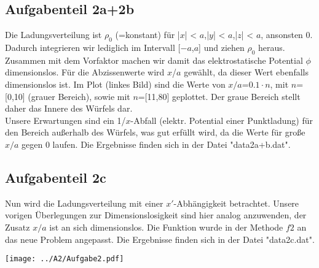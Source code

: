 \subsection*{Aufgabenteil 2a+2b}
Die Ladungsverteilung ist $\rho_0$ (=konstant) für |$x$| < $a$,|$y$| < $a$,|$z$| < $a$, ansonsten 0. Dadurch integrieren wir lediglich im Intervall [$-a$,$a$] und ziehen $\rho_0$ heraus. Zusammen mit dem Vorfaktor machen wir damit das elektrostatische Potential $\phi$ dimensionslos. Für die Abzissenwerte wird $x$/$a$ gewählt, da dieser Wert ebenfalls dimensionslos ist. Im Plot (linkes Bild) sind die Werte von $x/a$=$0.1\cdot n$, mit $n$=[0,10] (grauer Bereich), sowie mit $n$=[11,80] geplottet. Der graue Bereich stellt daher das Innere des Würfels dar. \\
Unsere Erwartungen sind ein 1/$x$-Abfall (elektr. Potential einer Punktladung) für den Bereich außerhalb des Würfels, was gut erfüllt wird, da die Werte für große $x/a$ gegen 0 laufen. Die Ergebnisse finden sich in der Datei "data2a+b.dat".
\subsection*{Aufgabenteil 2c}
Nun wird die Ladungsverteilung mit einer $x'$-Abhängigkeit betrachtet. Unsere vorigen Überlegungen zur Dimensionslosigkeit sind hier analog anzuwenden, der Zusatz $x/a$ ist an sich dimensionslos. Die Funktion wurde in der Methode $f2$ an das neue Problem angepasst.
Die Ergebnisse finden sich in der Datei "data2c.dat".

\begin{landscape}
\thispagestyle{empty}
\hspace{-5cm}
\texttt{[image: ../A2/Aufgabe2.pdf]}
\end{landscape}


